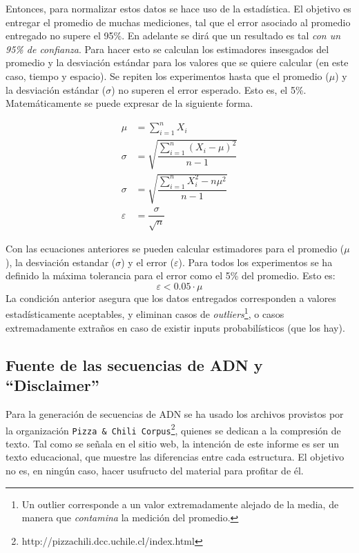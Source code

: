 \documentclass[12pt,letterpaper]{report}
\begin{document}
Entonces, para normalizar estos datos se hace uso de la estadística. El objetivo es entregar el promedio de muchas mediciones, tal que el error asociado al promedio entregado no supere el 95\%. En adelante se dirá que un resultado es tal \emph{con un 95\% de confianza}. Para hacer esto se calculan los estimadores insesgados del promedio y la desviación estándar para los valores que se quiere calcular (en este caso, tiempo y espacio). Se repiten los experimentos hasta que el promedio ($\mu$) y la desviación estándar ($\sigma$) no superen el error esperado. Esto es, el 5\%. Matemáticamente se puede expresar de la siguiente forma.

\begin{align}
  \mu &= \sum_{i=1}^n X_i \nonumber \\
  \sigma &= \sqrt{\dfrac{\sum_{i=1}^n (X_i - \mu)^{2}}{n-1}} \nonumber \\
  \sigma &= \sqrt{\dfrac{\sum_{i=1}^n X_i^2 - n\mu^2}{n-1}} \nonumber \\
  \varepsilon &= \dfrac{\sigma}{\sqrt{n}} \nonumber
\end{align}

Con las ecuaciones anteriores se pueden calcular estimadores para el promedio ($\mu$), la desviación estandar ($\sigma$) y el error ($\varepsilon$). Para todos los experimentos se ha definido la máxima tolerancia para el error como el 5\% del promedio. Esto es:
$$\varepsilon < 0.05\cdot \mu$$
La condición anterior asegura que los datos entregados corresponden a valores estadísticamente aceptables, y eliminan casos de \emph{outliers}\footnote{Un outlier corresponde a un valor extremadamente alejado de la media, de manera que \emph{contamina} la medición del promedio.}, o casos extremadamente extraños en caso de existir inputs probabilísticos (que los hay).

\subsection{Fuente de las secuencias de ADN y ``Disclaimer''}
\label{subsec:fuente_textos}

Para la generación de secuencias de ADN se ha usado los archivos provistos por la organización \texttt{Pizza \& Chili Corpus}\footnote{http://pizzachili.dcc.uchile.cl/index.html}, quienes se dedican a la compresión de texto. Tal como se señala en el sitio web, la intención de este informe es ser un texto educacional, que muestre las diferencias entre cada estructura. El objetivo no es, en ningún caso, hacer usufructo del material para profitar de él.\\
\end{document}
